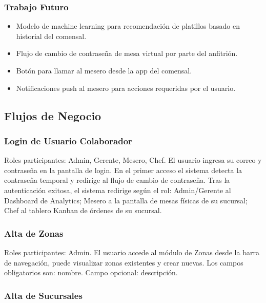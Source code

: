 \subsubsection{Trabajo Futuro}

\begin{itemize}[leftmargin=1.5em]
  \item Modelo de machine learning para recomendación de platillos basado en
        historial del comensal.
  \item Flujo de cambio de contraseña de mesa virtual por parte del anfitrión.
  \item Botón para llamar al mesero desde la app del comensal.
  \item Notificaciones push al mesero para acciones requeridas por el usuario.
\end{itemize}

\subsection{Flujos de Negocio}

\subsubsection{Login de Usuario Colaborador}

Roles participantes: Admin, Gerente, Mesero, Chef. El usuario ingresa su correo
y contraseña en la pantalla de login. En el primer acceso el sistema detecta la
contraseña temporal y redirige al flujo de cambio de contraseña. Tras la
autenticación exitosa, el sistema redirige según el rol: Admin/Gerente al Dashboard
de Analytics; Mesero a la pantalla de mesas físicas de su sucursal; Chef al
tablero Kanban de órdenes de su sucursal.

\subsubsection{Alta de Zonas}

Roles participantes: Admin. El usuario accede al módulo de Zonas desde la barra
de navegación, puede visualizar zonas existentes y crear nuevas. Los campos
obligatorios son: nombre. Campo opcional: descripción.

\subsubsection{Alta de Sucursales}

